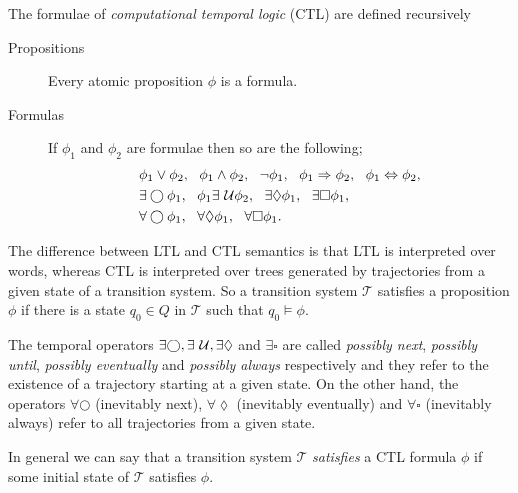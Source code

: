 \begin{defi}[CLT]
The formulae of \emph{computational temporal logic} (CTL) are defined recursively
\begin{description}
    \item[Propositions]{Every atomic proposition $\phi$ is a formula.}
    \item[Formulas]{If $\phi_{1}$ and $\phi_{2}$ are formulae then so are the following;
    \begin{align*}
        & \phi_{1} \lor \phi_{2},\ \ \phi_{1} \land \phi_{2}, \ \ \lnot \phi_{1}, \ \
        \phi_{1} \Rightarrow \phi_{2},\ \ \phi_{1} \Leftrightarrow \phi_{2}, \\
        & \exists\bigcirc \phi_{1}, \ \ \phi_{1} \exists\until \phi_{2}, \ \
        \exists\lozenge \phi_{1}, \ \ \exists\square \phi_{1}, \\
        & \forall\bigcirc \phi_{1}, \ \ \forall\lozenge \phi_{1}, \ \ \forall\square \phi_{1}.
    \end{align*}}
\end{description}
\end{defi}

The difference between LTL and CTL semantics is that LTL is interpreted over words, whereas CTL is interpreted over trees generated by trajectories from a given state of a transition system. So a transition system $\mathcal{T}$ satisfies a proposition $\phi$ if there is a state $q_{0}\in Q$ in $\mathcal{T}$ such that $q_{0}\models \phi$.

The temporal operators $\exists\bigcirc, \exists\ \mathcal{U}, \exists\lozenge$ and $\exists\square$ are called \emph{possibly next}, \emph{possibly until}, \emph{possibly eventually} and \emph{possibly always} respectively and they refer to the existence of a trajectory starting at a given state. On the other hand, the operators $\forall\bigcirc$ (inevitably next), $\forall\lozenge$ (inevitably eventually) and $\forall\square$ (inevitably always) refer to all trajectories from a given state.

In general we can say that a transition system $\mathcal{T}$ \emph{satisfies} a CTL formula $\phi$ if some initial state of $\mathcal{T}$ satisfies $\phi$.

